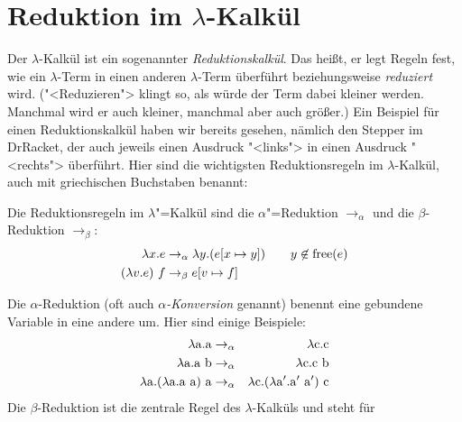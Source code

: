 \section{Reduktion im $\lambda$-Kalkül}

Der $\lambda$-Kalkül ist ein sogenannter
\textit{Reduktionskalkül}. Das heißt, er legt
Regeln fest, wie ein $\lambda$-Term in einen anderen $\lambda$-Term
überführt beziehungsweise \textit{reduziert} wird.  ("<Reduzieren">
klingt so, als würde der Term dabei kleiner werden.  Manchmal wird er
auch kleiner, manchmal aber auch größer.)  Ein Beispiel für einen
Reduktionskalkül haben wir bereits gesehen, nämlich den Stepper im
DrRacket, der auch jeweils einen Ausdruck "<links"> in einen Ausdruck
"<rechts"> überführt.  Hier sind die wichtigsten Reduktionsregeln im
$\lambda$-Kalkül, auch mit griechischen Buchstaben benannt:
%
\begin{definition}[Reduktionsregeln]
  Die Reduktionsregeln im $\lambda$"=Kalkül sind
  die $\alpha$"=Reduktion $\rightarrow_{\alpha}$ und die
  $\beta$-Reduktion $\rightarrow_{\beta}$:%
  \begin{alignat*}{2}
    \lambda x.e & \rightarrow_{\alpha} \lambda y.(e[x\mapsto y]) \quad 
    & y\not\in\operatorname{free}(e)
    \\
    (\lambda v.e)~f & \rightarrow_{\beta} e[v\mapsto f]
  \end{alignat*}
\end{definition}
%
Die $\alpha$-Reduktion (oft auch \textit{$\alpha$-Konversion} genannt)
benennt eine gebundene Variable in eine andere um.  Hier sind einige
Beispiele:
%
\begin{eqnarray*}
  \lambda \mathrm a.\mathrm a & \rightarrow_{\alpha} & \lambda \mathrm c.\mathrm c\\
  \lambda \mathrm a.\mathrm a~\mathrm b & \rightarrow_{\alpha} & \lambda \mathrm c.\mathrm c~\mathrm b\\
  \lambda \mathrm a.(\lambda \mathrm a.\mathrm a~\mathrm a)~\mathrm a & \rightarrow_{\alpha} & 
  \lambda \mathrm c.(\lambda \mathrm a'.\mathrm a'~\mathrm a')~\mathrm c
\end{eqnarray*}
%
Die $\beta$-Reduktion ist die zentrale Regel des $\lambda$-Kalküls und steht für
